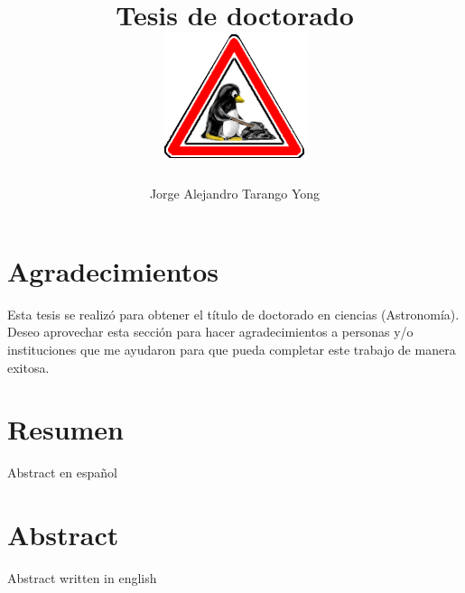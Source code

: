 \documentclass[11pt]{book}
\title{Tesis de doctorado\\
\includegraphics[width=0.1\linewidth]{./Figures/tux-development}
}
\author{Jorge Alejandro Tarango Yong}
\begin{document}
\maketitle
\pagestyle{empty}

\tableofcontents
\newpage
\section*{Agradecimientos}

Esta tesis se realizó para obtener el título de doctorado en 
ciencias (Astronomía). Deseo aprovechar esta sección para hacer
agradecimientos a personas y/o instituciones que me ayudaron para que 
pueda completar este trabajo de manera exitosa.
\newpage
\section*{Resumen}
  Abstract en español

\newpage
\section*{Abstract}
  Abstract written in english

\newpage

  

\pagestyle{fancy}
\fancyhf{}
\fancyhead[L]{\truncate{0.5\headwidth}{\footnotesize \leftmark}}
\fancyhead[R]{\truncate{0.5\headwidth}{\footnotesize \rightmark}}








\newpage

\end{document}
